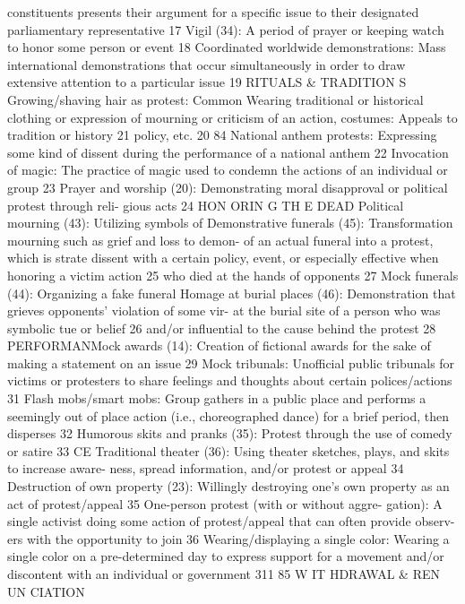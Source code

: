 \documentclass[twoside,a4paper,12pt,fleqn,openany]{extbook}
\begin{document}
constituents presents their argument for a
specific issue to their designated parliamentary
representative
 17
Vigil (34): A period of prayer or keeping watch
to honor some person or event
 18
Coordinated worldwide demonstrations:
Mass international demonstrations that occur
simultaneously in order to draw extensive
attention to a particular issue
 19
RITUALS & TRADITION S
Growing/shaving hair as protest: Common
 Wearing traditional or historical clothing or
expression of mourning or criticism of an action,
 costumes: Appeals to tradition or history 21
policy, etc.
 20
84
National anthem protests: Expressing some
kind of dissent during the performance of a
national anthem
 22
Invocation of magic: The practice of magic
used to condemn the actions of an individual
or group
 23
Prayer and worship (20): Demonstrating moral
disapproval or political protest through reli-
gious acts
 24
HON ORIN G TH E DEAD
Political mourning (43): Utilizing symbols of
 Demonstrative funerals (45): Transformation
mourning such as grief and loss to demon-
 of an actual funeral into a protest, which is
strate dissent with a certain policy, event, or
 especially effective when honoring a victim
action
 25
 who died at the hands of opponents
 27
Mock funerals (44): Organizing a fake funeral
 Homage at burial places (46): Demonstration
that grieves opponents’ violation of some vir-
 at the burial site of a person who was symbolic
tue or belief
 26
 and/or influential to the cause behind the
protest
 28
PERFORMANMock awards (14): Creation of fictional awards
for the sake of making a statement on an
issue
 29
Mock tribunals: Unofficial public tribunals for
victims or protesters to share feelings and
thoughts about certain polices/actions
 31
Flash mobs/smart mobs: Group gathers in a
public place and performs a seemingly out of
place action (i.e., choreographed dance) for a
brief period, then disperses
 32
Humorous skits and pranks (35): Protest
through the use of comedy or satire
 33
CE
Traditional theater (36): Using theater
sketches, plays, and skits to increase aware-
ness, spread information, and/or protest or
appeal
 34
Destruction of own property (23): Willingly
destroying one’s own property as an act of
protest/appeal
 35
One-person protest (with or without aggre-
gation): A single activist doing some action of
protest/appeal that can often provide observ-
ers with the opportunity to join
 36
Wearing/displaying a single color: Wearing a
single color on a pre-determined day to express
support for a movement and/or discontent with
an individual or government
 311
85
W IT HDRAWAL & REN UN CIATION
\end{document}
